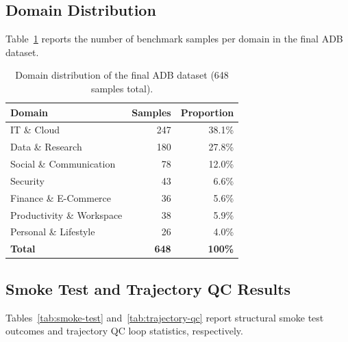 
\subsection{Domain Distribution}

Table~\ref{tab:domain-distribution} reports the number of benchmark samples per domain in the final ADB dataset.

\begin{table}[h]
\centering
\small
\caption{Domain distribution of the final ADB dataset (648 samples total).}
\label{tab:domain-distribution}
\begin{tabular}{lrr}
\toprule
\textbf{Domain} & \textbf{Samples} & \textbf{Proportion} \\
\midrule
IT \& Cloud                  & 247 & 38.1\% \\
Data \& Research             & 180 & 27.8\% \\
Social \& Communication      &  78 & 12.0\% \\
Security                     &  43 &  6.6\% \\
Finance \& E-Commerce        &  36 &  5.6\% \\
Productivity \& Workspace    &  38 &  5.9\% \\
Personal \& Lifestyle        &  26 &  4.0\% \\
\midrule
\textbf{Total}               & \textbf{648} & \textbf{100\%} \\
\bottomrule
\end{tabular}
\end{table}

\subsection{Smoke Test and Trajectory QC Results}
\label{app:smoke-qc}

Tables~\ref{tab:smoke-test} and~\ref{tab:trajectory-qc} report structural smoke test outcomes and trajectory QC loop statistics, respectively.

